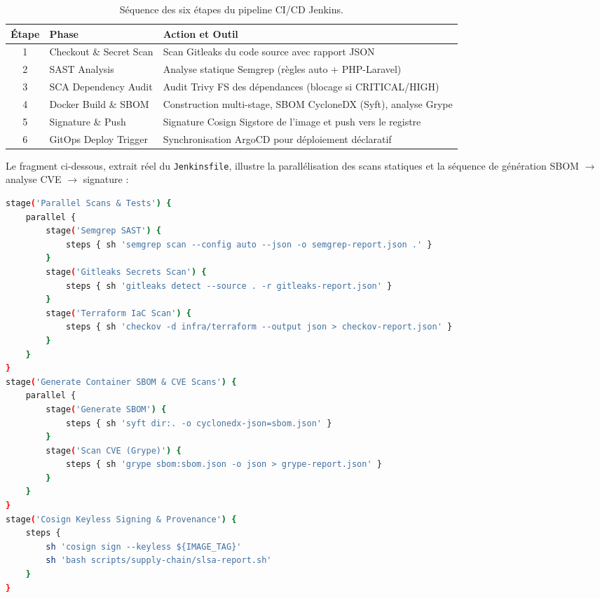 \begin{table}[H]
\centering
\scriptsize
\begin{tabular}{@{}clp{8cm}@{}}
\toprule
\textbf{Étape} & \textbf{Phase} & \textbf{Action et Outil} \\
\midrule
1 & Checkout \& Secret Scan & Scan Gitleaks du code source avec rapport JSON \\
2 & SAST Analysis & Analyse statique Semgrep (règles auto + PHP-Laravel) \\
3 & SCA Dependency Audit & Audit Trivy FS des dépendances (blocage si CRITICAL/HIGH) \\
4 & Docker Build \& SBOM & Construction multi-stage, SBOM CycloneDX (Syft), analyse Grype \\
5 & Signature \& Push & Signature Cosign Sigstore de l'image et push vers le registre \\
6 & GitOps Deploy Trigger & Synchronisation ArgoCD pour déploiement déclaratif \\
\bottomrule
\end{tabular}
\caption{Séquence des six étapes du pipeline CI/CD Jenkins.}
\label{tab:pipeline_stages}
\end{table}

Le fragment ci-dessous, extrait réel du \texttt{Jenkinsfile}, illustre la parallélisation des scans statiques et la séquence de génération SBOM $\rightarrow$ analyse CVE $\rightarrow$ signature :

\begin{lstlisting}[language=bash, caption={Extraits réels du \texttt{Jenkinsfile} — scans parallèles, SBOM, signature Cosign}, label={lst:jenkinsfile_stages_reels}]
stage('Parallel Scans & Tests') {
    parallel {
        stage('Semgrep SAST') {
            steps { sh 'semgrep scan --config auto --json -o semgrep-report.json .' }
        }
        stage('Gitleaks Secrets Scan') {
            steps { sh 'gitleaks detect --source . -r gitleaks-report.json' }
        }
        stage('Terraform IaC Scan') {
            steps { sh 'checkov -d infra/terraform --output json > checkov-report.json' }
        }
    }
}
stage('Generate Container SBOM & CVE Scans') {
    parallel {
        stage('Generate SBOM') {
            steps { sh 'syft dir:. -o cyclonedx-json=sbom.json' }
        }
        stage('Scan CVE (Grype)') {
            steps { sh 'grype sbom:sbom.json -o json > grype-report.json' }
        }
    }
}
stage('Cosign Keyless Signing & Provenance') {
    steps {
        sh 'cosign sign --keyless ${IMAGE_TAG}'
        sh 'bash scripts/supply-chain/slsa-report.sh'
    }
}
\end{lstlisting}

